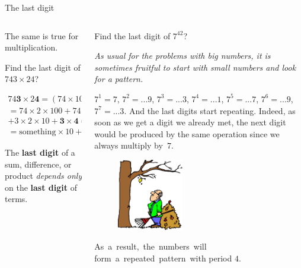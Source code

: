 \documentclass[9pt,aspectratio=169]{beamer}
\begin{document}
\begin{frame}{The last digit}
\begin{columns}[T]
\begin{column}{0.5\textwidth}
      The same is true for multiplication.
      \begin{problem}
        Find the last digit of $743 \times 24$?
      \end{problem}\vspace*{-1.2\baselineskip}
      \begin{multline*}
        74\mathbf{3} \times 2\mathbf{4} = (74 \times 10 + \mathbf{3}) (2 \times 10 + \mathbf{4}) = \\ 
        = 74 \times 2 \times 100 + 74 \times 4 \times 10 + {} \\
         + 3 \times 2 \times 10 + \mathbf{3} \times \mathbf{4} = \\
        = \text{something} \times 10 + \mathbf{12} = (\text{something} + 1) \times 10 + \mathbf{2}.
      \end{multline*}\vspace*{-0.8\baselineskip}
      \begin{definition}
        The \textbf{last digit} of a sum, difference, or product \emph{depends only} on the \textbf{last digit} of terms.
      \end{definition}
    \end{column}
    \begin{column}{0.5\textwidth}
      \begin{problem}
        Find the last digit of $7^{42}$?
      \end{problem}
      \begin{example}
        \emph{As usual for the problems with big numbers, it is sometimes fruitful to start with small numbers and look for a pattern.}
      \end{example}

      $7^1 = 7$, $7^2 = ...9$, $7^3 = ...3$, $7^4 = ...1$, $7^5 = ...7$, $7^6 = ...9$, $7^7 = ...3$.
      And the last digits start repeating. Indeed, as soon as we get a digit we already met, the next digit would be produced by the same operation since we always multiply by~$7$.
      \begin{figure}
        \vspace*{-0.5em}
        \hspace*{-1.3em}
        \includegraphics[width=0.4\textwidth]{05 - Number Theory 102/the-last-one-leaf.png}
      \end{figure}
      As~a~result,~the~numbers~will form~a~repeated~pattern~with period $4$. 


\end{column}
\end{columns}
\end{frame}
\end{document}
